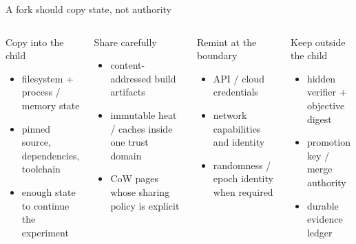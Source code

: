 \begin{frame}{A fork should copy state, not authority}
\small
\begin{columns}[T,onlytextwidth]
\begin{block}{Copy into the child}
\begin{itemize}
  \item filesystem + process / memory state
  \item pinned source, dependencies, toolchain
  \item enough state to continue the experiment
\end{itemize}
\end{block}

\begin{block}{Share carefully}
\begin{itemize}
  \item content-addressed build artifacts
  \item immutable heat / caches inside one trust domain
  \item CoW pages whose sharing policy is explicit
\end{itemize}
\end{block}

\begin{block}{Remint at the boundary}
\begin{itemize}
  \item API / cloud credentials
  \item network capabilities and identity
  \item randomness / epoch identity when required
\end{itemize}
\end{block}

\begin{block}{Keep outside the child}
\begin{itemize}
  \item hidden verifier + objective digest
  \item promotion key / merge authority
  \item durable evidence ledger
\end{itemize}
\end{block}
\end{columns}

\vspace{0.35em}
\begin{center}
\Large {}
\end{center}
\end{frame}
